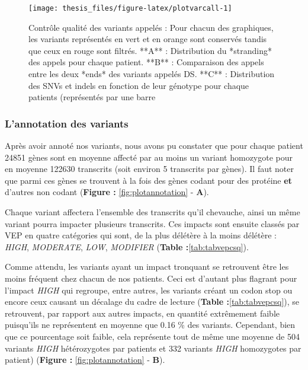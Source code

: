 \documentclass[12pt,twoside]{reedthesis}
\theoremstyle{definition}
\theoremstyle{definition}
\theoremstyle{remark}
\begin{document}
  \newpage
  
  \begin{figure}
  
  {\centering \texttt{[image: thesis\_files/figure-latex/plotvarcall-1]} 
  
  }
  
  \caption[Contrôle qualité des variants appelés]{Contrôle qualité des variants appelés : Pour chacun des graphiques, les variants représentés en vert et en orange sont conservés tandis que ceux en rouge sont filtrés. **A** : Distribution du *stranding* des appels pour chaque patient. **B** : Comparaison des appels entre les deux *ends* des variants appelés DS. **C** : Distribution des SNVs et indels en fonction de leur génotype pour chaque patients (représentés par une barre}\label{fig:plotvarcall}
  \end{figure}
  
  \newpage
  
  \subsubsection{L'annotation des
  variants}\label{lannotation-des-variants}
  
  Après avoir annoté nos variants, nous avons pu constater que pour chaque
  patient 24851 gènes sont en moyenne affecté par au moins un variant
  homozygote pour en moyenne 122630 transcrits (soit environ 5 transcrits
  par gènes). Il faut noter que parmi ces gènes se trouvent à la fois des
  gènes codant pour des protéine \textbf{et} d'autres non codant
  (\textbf{Figure : }\ref{fig:plotannotation} - \textbf{A}).
  
  Chaque variant affectera l'ensemble des transcrits qu'il chevauche,
  ainsi un même variant pourra impacter plusieurs transcrits. Ces impacts
  sont ensuite classés par VEP en quatre catégories qui sont, de la plus
  délétère à la moins délétère : \emph{HIGH}, \emph{MODERATE}, \emph{LOW},
  \emph{MODIFIER} (\textbf{Table :}\ref{tab:tabvepcsq}).
  
  Comme attendu, les variants ayant un impact tronquant se retrouvent être
  les moins fréquent chez chacun de nos patients. Ceci est d'autant plus
  flagrant pour l'impact \emph{HIGH} qui regroupe, entre autres, les
  variants créant un codon stop ou encore ceux causant un décalage du
  cadre de lecture (\textbf{Table :}\ref{tab:tabvepcsq}), se retrouvent,
  par rapport aux autres impacts, en quantité extrêmement faible
  puisqu'ils ne représentent en moyenne que 0.16 \% des variants.
  Cependant, bien que ce pourcentage soit faible, cela représente tout de
  même une moyenne de 504 variants \emph{HIGH} hétérozygotes par patients
  et 332 variants \emph{HIGH} homozygotes par patient) (\textbf{Figure :
  }\ref{fig:plotannotation} - \textbf{B}).
  
\end{document}
